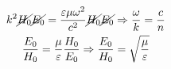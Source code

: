 
\begin{gather*}
    k^2\cancel{H_0}\cancel{E_0}=\frac{\varepsilon\mu\omega^2}{c^2}\cancel{H_0}\cancel{E_0} \Rightarrow \frac{\omega}{k}=\frac{c}{n} \\
    \frac{E_0}{H_0}=\frac{\mu}{\varepsilon} \frac{H_0}{E_0}\Rightarrow \frac{E_0}{H_0}=\sqrt{\frac{\mu}{\varepsilon} }      
\end{gather*}
